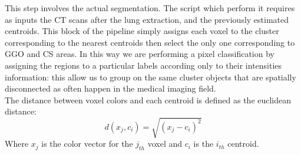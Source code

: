 \documentclass{standalone}
\begin{document}
	This step involves the actual segmentation. The script which perform it requires as inputs the CT scans after the lung extraction, and the previously estimated centroids. This block of the pipeline simply assigns each voxel to the cluster corresponding to the nearest centroids then select the only one corresponding to GGO and CS areas. In this way we are performing a pixel classification by assigning the regions to a particular labels according only to their intensities information: this allow us to group on the same cluster objects that are spatially disconnected as often happen in the medical imaging field.\\
	The distance between voxel colors and each centroid is defined as the euclidean distance:
	\begin{equation*}
		d(x_j, c_i) = \sqrt{(x_j - c_i)^2}
	\end{equation*} 
	Where $x_j$ is the color vector for the $j_{th}$ voxel and $c_i$ is the $i_{th}$ centroid.\\
	

	
\end{document}
